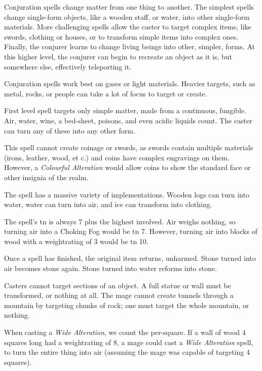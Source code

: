 
\begin{multicols}{2}

\noindent
Conjuration spells change matter from one thing to another.
The simplest spells change single-form objects, like a wooden staff, or water, into other single-form materials.
More challenging spells allow the caster to target complex items, like swords, clothing or houses, or to transform simple items into complex ones.
Finally, the conjurer learns to change living beings into other, simpler, forms.
At this higher level, the conjurer can begin to recreate an object as it is, but somewhere else, effectively teleporting it.

Conjuration spells work best on gases or light materials.
Heavier targets, such as metal, rocks, or people can take a lot of focus to target or create.

\spelllevel

First level spell targets only simple matter, made from a continuous, fungible.
Air, water, wine, a bed-sheet, poisons, and even acidic liquids count.
The caster can turn any of these into any other form.

This spell cannot create coinage or swords, as swords contain multiple materials (irons, leather, wood, et c.) and coins have complex engravings on them.
However, a \textit{Colourful Alteration} would allow coins to show the standard face or other insignia of the realm.

The spell has a massive variety of implementations.
Wooden logs can turn into water, water can turn into air, and ice can transform into clothing.

The spell's \gls{tn} is always 7 plus the highest  involved.
Air weighs nothing, so turning air into a Choking Fog would be \gls{tn} 7.
However, turning air into blocks of wood with a \gls{weightrating} of 3 would be \gls{tn} 10.

Once a spell has finished, the original item returns, unharmed.
Stone turned into air becomes stone again.
Stone turned into water reforms into stone.

Casters cannot target sections of an object.
A full statue or wall must be transformed, or nothing at all.
The mage cannot create tunnels through a mountain by targeting chunks of rock; one must target the whole mountain, or nothing.

When casting a \textit{Wide Alteration}, we count the  per-square.
If a wall of wood 4 squares long had a \gls{weightrating} of 8, a mage could cast a \textit{Wide Alteration} spell, to turn the entire thing into air (assuming the mage was capable of targeting 4 squares).


\end{multicols}
